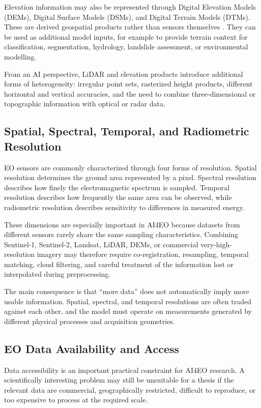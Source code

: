 \documentclass[11pt,a4paper]{article}
\begin{document}
Elevation information may also be represented through Digital Elevation
Models (DEMs), Digital Surface Models (DSMs), and Digital Terrain Models
(DTMs). These are derived geospatial products rather than sensors
themselves \cite{guth2021dem,usgs_dem_definition}. They can be used as
additional model inputs, for example to provide terrain context for
classification, segmentation, hydrology, landslide assessment, or
environmental modelling.

From an AI perspective, LiDAR and elevation products introduce additional
forms of heterogeneity: irregular point sets, rasterized height products,
different horizontal and vertical accuracies, and the need to combine
three-dimensional or topographic information with optical or radar data.

\subsection{Spatial, Spectral, Temporal, and Radiometric Resolution}

EO sensors are commonly characterized through four forms of resolution.
Spatial resolution determines the ground area represented by a pixel.
Spectral resolution describes how finely the electromagnetic spectrum is
sampled. Temporal resolution describes how frequently the same area can
be observed, while radiometric resolution describes sensitivity to
differences in measured energy.

These dimensions are especially important in AI4EO because datasets from
different sensors rarely share the same sampling characteristics.
Combining Sentinel-1, Sentinel-2, Landsat, LiDAR, DEMs, or commercial
very-high-resolution imagery may therefore require co-registration,
resampling, temporal matching, cloud filtering, and careful treatment of
the information lost or interpolated during preprocessing.

The main consequence is that ``more data'' does not automatically imply
more usable information. Spatial, spectral, and temporal resolutions are
often traded against each other, and the model must operate on
measurements generated by different physical processes and acquisition
geometries.

\subsection{EO Data Availability and Access}

Data accessibility is an important practical constraint for AI4EO
research. A scientifically interesting problem may still be unsuitable
for a thesis if the relevant data are commercial, geographically
restricted, difficult to reproduce, or too expensive to process at the
required scale.
\end{document}
